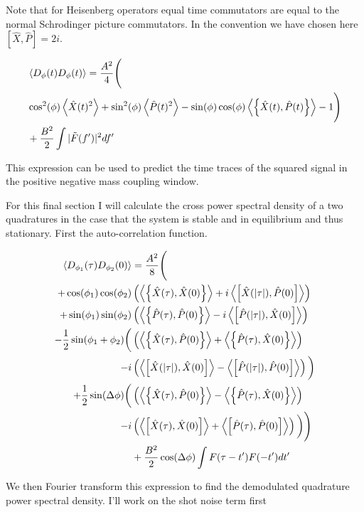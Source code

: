 \documentclass[12pt]{article}
\begin{document}
Note that for Heisenberg operators equal time commutators are equal to the normal Schrodinger picture commutators. In the convention we have chosen here $[\hat{X},\hat{P}] = 2i$.

\begin{align}
&\Braket{D_{\phi}(t)D_{\phi}(t)} =\frac{A^2}{4}\Bigg(\\
&\cos^2(\phi)\Braket{\hat{X}(t)^2} + \sin^2(\phi)\Braket{\hat{P}(t)^2} -\sin(\phi)\cos(\phi)\Braket{\left\{\hat{X}(t),\hat{P}(t)\right\}} -1
\Bigg)\\
&+\frac{B^2}{2}\int |\tilde{F}(f')|^2 df'
\end{align}

This expression can be used to predict the time traces of the squared signal in the positive negative mass coupling window.

For this final section I will calculate the cross power spectral density of a two quadratures in the case that the system is stable and in equilibrium and thus stationary. First the auto-correlation function.

\begin{align}
\Braket{D_{\phi_1}(\tau)D_{\phi_2}(0)} &=\frac{A^2}{8}\Bigg(\\
+\cos(\phi_1)\cos(\phi_2)&\left(\Braket{\left\{\hat{X}(\tau),\hat{X}(0)\right\}}+i\Braket{\left[\hat{X}(\lvert\tau\rvert),\hat{P}(0)\right]}\right)\\
+\sin(\phi_1)\sin(\phi_2)&\left(\Braket{\left\{\hat{P}(\tau),\hat{P}(0)\right\}}-i\Braket{\left[\hat{P}(\lvert\tau\rvert),\hat{X}(0)\right]}\right)\\
-\frac{1}{2}\sin(\phi_1+\phi_2)\bigg(&\left(\Braket{\left\{\hat{X}(\tau),\hat{P}(0)\right\}}+\Braket{\left\{\hat{P}(\tau),\hat{X}(0)\right\}}\right)\\
-i&\left(\Braket{\left[\hat{X}(\lvert\tau\rvert),\hat{X}(0)\right]}-\Braket{\left[\hat{P}(\lvert\tau\rvert),\hat{P}(0)\right]}\right)\bigg)\\
+\frac{1}{2}\sin(\Delta\phi)\bigg(&\left(\Braket{\left\{\hat{X}(\tau),\hat{P}(0)\right\}}-\Braket{\left\{\hat{P}(\tau),\hat{X}(0)\right\}}\right)\\
-i&\left(\Braket{\left[\hat{X}(\tau),\hat{X}(0)\right]}+\Braket{\left[\hat{P}(\tau),\hat{P}(0)\right]}\right)\bigg)\Bigg)\\
&+\frac{B^2}{2}\cos(\Delta\phi)\int F(\tau-t')F(-t')dt'
\end{align}

We then Fourier transform this expression to find the demodulated quadrature power spectral density. I'll work on the shot noise term first
\end{document}
